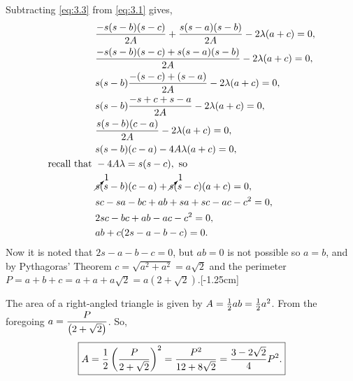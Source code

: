 Subtracting \eqref{eq:3.3} from \eqref{eq:3.1} gives,
\begin{align*}
	{}&\frac{-s(s-b)(s-c)}{2A} + \frac{s(s-a)(s-b)}{2A} -2\lambda(a+c) = 0,\\
	{}&\frac{-s(s-b)(s-c) + s(s-a)(s-b)}{2A} - 2\lambda(a+c) = 0,\\
	{}&s(s-b)\frac{-(s-c) + (s-a)}{2A} - 2\lambda(a+c) = 0,\\
	{}&s(s-b)\frac{-s+c + s-a}{2A} - 2\lambda(a+c) = 0,\\
	{}&\frac{s(s-b)(c-a)}{2A} - 2\lambda(a+c) = 0,\\
	{}&s(s-b)(c-a) - 4A\lambda(a+c) = 0,\\
	\text{recall that }{}& -4A\lambda = s(s-c), \text{ so }\\
	{}&\cancelto{1}{s}(s-b)(c-a) +\cancelto{1}{s}(s-c)(a+c) = 0,\\
	{}&sc-sa-bc+ab+sa+sc-ac-c^2=0,\\
	{}&2sc-bc+ab -ac-c^2=0,\\
	{}&ab + c(2s - a - b - c)=0.
\end{align*}
Now it is noted that $2s - a - b - c = 0$, but $ab = 0$ is not possible so $a = b$, and by Pythagoras' Theorem $c=\sqrt{a^2 + a^2} = a\sqrt{2}$ and the perimeter $P=a+b+c = a + a + a\sqrt{2} = a(2+\sqrt{2})$.[-1.25cm]%

The area of a right-angled triangle is given by $A = \frac{1}{2} a b = \frac{1}{2} a^2$. From the foregoing $a = \dfrac{P}{\left(2+\sqrt{2}\right)}$.
So,
\[
	\boxed{A = \frac{1}{2}\left(\frac{P}{2+\sqrt{2}}\right)^2 = \frac{P^2}{12+8\sqrt{2}} = \frac{3-2\sqrt{2}}{4}P^2.}
\]

